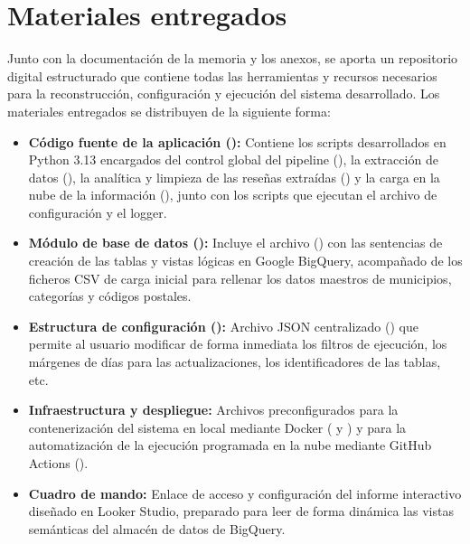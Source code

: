 \section{Materiales entregados}
Junto con la documentación de la memoria y los anexos, se aporta un repositorio digital estructurado que contiene todas las herramientas y recursos necesarios para la reconstrucción, configuración y ejecución del sistema desarrollado. Los materiales entregados se distribuyen de la siguiente forma:

\begin{itemize}
    \item \textbf{Código fuente de la aplicación ():} Contiene los scripts desarrollados en Python 3.13 encargados del control global del pipeline (), la extracción de datos (), la analítica y limpieza de las reseñas extraídas () y la carga en la nube de la información (), junto con los scripts que ejecutan el archivo de configuración y el logger.
    \item \textbf{Módulo de base de datos ():} Incluye el archivo () con las sentencias de creación de las tablas y vistas lógicas en Google BigQuery, acompañado de los ficheros CSV de carga inicial para rellenar los datos maestros de municipios, categorías y códigos postales.
    \item \textbf{Estructura de configuración ():} Archivo JSON centralizado () que permite al usuario modificar de forma inmediata los filtros de ejecución, los márgenes de días para las actualizaciones, los identificadores de las tablas, etc.
    \item \textbf{Infraestructura y despliegue:} Archivos preconfigurados para la contenerización del sistema en local mediante Docker ( y ) y para la automatización de la ejecución programada en la nube mediante GitHub Actions ().
    \item \textbf{Cuadro de mando:} Enlace de acceso y configuración del informe interactivo diseñado en Looker Studio, preparado para leer de forma dinámica las vistas semánticas del almacén de datos de BigQuery.
\end{itemize}
